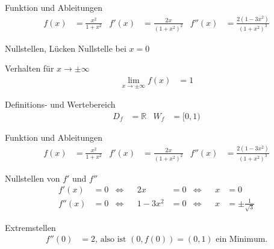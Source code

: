\begin{taskframes}{3.107}

\begin{taskframe}
    \begin{mathbox}{Funktion und Ableitungen}
        \begin{align*}
            f(x) &= \frac{x^2}{1+x^2} & f'(x) &= \frac{2x}{(1+x^2)^2} & f''(x) &= \frac{2(1-3x^2)}{(1+x^2)^3}
        \end{align*}
    \end{mathbox}

    \begin{tcbraster}[raster columns=2, raster equal height]
        \begin{textbox}{Nullstellen, Lücken}
            Nullstelle bei $x = 0$
        \end{textbox}
        \begin{mathbox}{Verhalten für $x \to \pm \infty$}
            \begin{align*}
                \lim_{x \to \pm \infty} f(x) &= 1
            \end{align*}
        \end{mathbox}
    \end{tcbraster}
    \begin{mathbox}{Definitions- und Wertebereich}
        \begin{align*}
            D_f &= \mathbb{R} & W_f &= [0, 1)
        \end{align*}
    \end{mathbox}
\end{taskframe}

\begin{taskframe}
    \begin{mathbox}{Funktion und Ableitungen}
        \begin{align*}
            f(x) &= \frac{x^2}{1+x^2} & f'(x) &= \frac{2x}{(1+x^2)^2} & f''(x) &= \frac{2(1-3x^2)}{(1+x^2)^3}
        \end{align*}
    \end{mathbox}
    \begin{mathbox}{Nullstellen von $f'$ und $f''$}
        \begin{align*}
            f'(x) &= 0 & \Leftrightarrow && 2x &= 0 & \Leftrightarrow && x &= 0 \\
            f''(x) &= 0 & \Leftrightarrow && 1 - 3x^2&= 0 &\Leftrightarrow && x &= \pm\frac{1}{\sqrt{3}}
        \end{align*}
    \end{mathbox}
    \begin{mathbox}{Extremstellen}
        \begin{align*}
            f''(0) &= 2 \text{, also ist $(0,f(0)) = (0,1)$ ein Minimum.}
        \end{align*}
    \end{mathbox}
\end{taskframe}


\end{taskframes}
